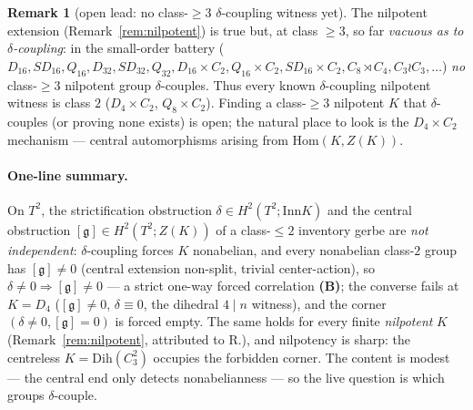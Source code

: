 \documentclass[11pt]{article}
\theoremstyle{definition}
\newtheorem{remark}[theorem]{Remark}
\newcommand{\Inn}{\mathrm{Inn}}
\newcommand{\gerbe}{\mathfrak{g}}
\begin{document}
\begin{remark}[open lead: no class-$\ge3$ $\delta$-coupling witness yet]\label{rem:openlead}
The nilpotent extension (Remark~\ref{rem:nilpotent}) is true but, at class $\ge3$, so far
\emph{vacuous as to $\delta$-coupling}: in the small-order battery
($D_{16},SD_{16},Q_{16},D_{32},SD_{32},Q_{32},D_{16}\times C_2,Q_{16}\times C_2,
SD_{16}\times C_2,C_8\rtimes C_4,C_3\wr C_3,\dots$) \emph{no} class-$\ge3$ nilpotent group
$\delta$-couples. Thus every known $\delta$-coupling nilpotent witness is class $2$
($D_4\times C_2$, $Q_8\times C_2$). Finding a class-$\ge3$ nilpotent $K$ that $\delta$-couples
(or proving none exists) is open; the natural place to look is the $D_4\times C_2$ mechanism ---
central automorphisms arising from $\mathrm{Hom}(K,Z(K))$.
\end{remark}

\paragraph{One-line summary.} On $T^2$, the strictification obstruction
$\delta\in H^2(T^2;\Inn K)$ and the central obstruction $[\gerbe]\in H^2(T^2;Z(K))$ of a
class-$\le2$ inventory gerbe are \emph{not independent}: $\delta$-coupling forces $K$
nonabelian, and every nonabelian class-$2$ group has $[\gerbe]\neq0$ (central extension
non-split, trivial center-action), so $\delta\neq0\Rightarrow[\gerbe]\neq0$ --- a strict
one-way forced correlation \textbf{(B)}; the converse fails at $K=D_4$ ($[\gerbe]\neq0$,
$\delta\equiv0$, the dihedral $4\mid n$ witness), and the corner $(\delta\neq0,[\gerbe]=0)$ is
forced empty. The same holds for every finite \emph{nilpotent} $K$ (Remark~\ref{rem:nilpotent},
attributed to R.), and nilpotency is sharp: the centreless $K=\mathrm{Dih}(C_3^2)$ occupies the
forbidden corner. The content is modest --- the central end only detects nonabelianness --- so
the live question is which groups $\delta$-couple.
\end{document}
